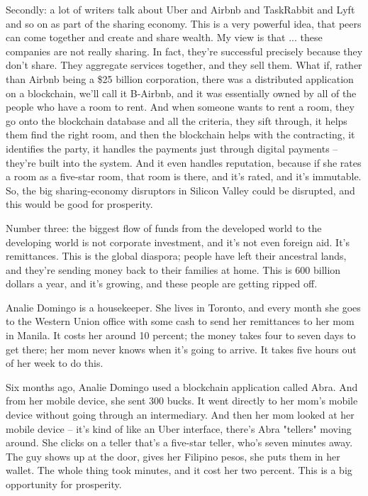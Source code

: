 \documentclass[a4paper]{article}
\begin{document}
Secondly: a lot of writers talk about Uber and Airbnb and TaskRabbit and Lyft and so on as part of the sharing economy. This is a very powerful idea, that peers can come together and create and share wealth. My view is that ... these companies are not really sharing. In fact, they're successful precisely because they don't share. They aggregate services together, and they sell them. What if, rather than Airbnb being a \$25 billion corporation, there was a distributed application on a blockchain, we'll call it B-Airbnb, and it was essentially owned by all of the people who have a room to rent. And when someone wants to rent a room, they go onto the blockchain database and all the criteria, they sift through, it helps them find the right room, and then the blockchain helps with the contracting, it identifies the party, it handles the payments just through digital payments -- they're built into the system. And it even handles reputation, because if she rates a room as a five-star room, that room is there, and it's rated, and it's immutable. So, the big sharing-economy disruptors in Silicon Valley could be disrupted, and this would be good for prosperity.

Number three: the biggest flow of funds from the developed world to the developing world is not corporate investment, and it's not even foreign aid. It's remittances. This is the global diaspora; people have left their ancestral lands, and they're sending money back to their families at home. This is 600 billion dollars a year, and it's growing, and these people are getting ripped off.

Analie Domingo is a housekeeper. She lives in Toronto, and every month she goes to the Western Union office with some cash to send her remittances to her mom in Manila. It costs her around 10 percent; the money takes four to seven days to get there; her mom never knows when it's going to arrive. It takes five hours out of her week to do this.

Six months ago, Analie Domingo used a blockchain application called Abra. And from her mobile device, she sent 300 bucks. It went directly to her mom's mobile device without going through an intermediary. And then her mom looked at her mobile device -- it's kind of like an Uber interface, there's Abra "tellers" moving around. She clicks on a teller that's a five-star teller, who's seven minutes away. The guy shows up at the door, gives her Filipino pesos, she puts them in her wallet. The whole thing took minutes, and it cost her two percent. This is a big opportunity for prosperity.
\end{document}
